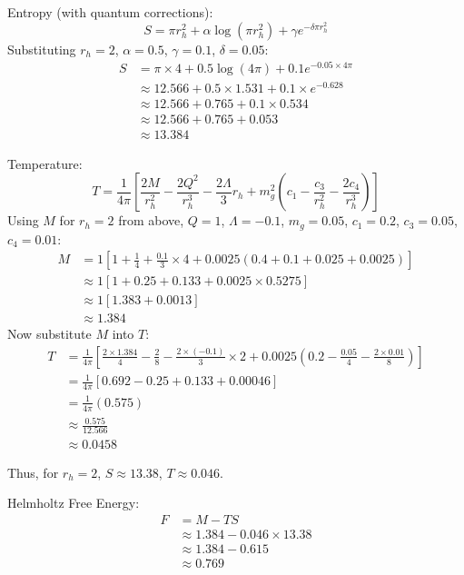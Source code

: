 \documentclass[12pt]{article}
\begin{document}
Entropy (with quantum corrections):
\begin{equation}
S = \pi r_h^2 + \alpha \log(\pi r_h^2) + \gamma e^{-\delta \pi r_h^2}
\end{equation}
Substituting $r_h = 2$, $\alpha = 0.5$, $\gamma = 0.1$, $\delta = 0.05$:
\begin{align*}
S &= \pi \times 4 + 0.5 \log(4\pi) + 0.1 e^{-0.05 \times 4\pi} \\
  &\approx 12.566 + 0.5 \times 1.531 + 0.1 \times e^{-0.628} \\
  &\approx 12.566 + 0.765 + 0.1 \times 0.534 \\
  &\approx 12.566 + 0.765 + 0.053 \\
  &\approx 13.384
\end{align*}

Temperature:
\begin{equation}
T = \frac{1}{4\pi} \left[ \frac{2M}{r_h^2} - \frac{2Q^2}{r_h^3} - \frac{2\Lambda}{3} r_h + m_g^2 \left(c_1 - \frac{c_3}{r_h^2} - \frac{2c_4}{r_h^3}\right) \right]
\end{equation}
Using $M$ for $r_h = 2$ from above, $Q = 1$, $\Lambda = -0.1$, $m_g = 0.05$, $c_1 = 0.2$, $c_3 = 0.05$, $c_4 = 0.01$:
\begin{align*}
M &= 1 \left[1 + \frac{1}{4} + \frac{0.1}{3} \times 4 + 0.0025 (0.4 + 0.1 + 0.025 + 0.0025)\right] \\
  &\approx 1 [1 + 0.25 + 0.133 + 0.0025 \times 0.5275] \\
  &\approx 1 [1.383 + 0.0013] \\
  &\approx 1.384
\end{align*}
Now substitute $M$ into $T$:
\begin{align*}
T &= \frac{1}{4\pi} \left[ \frac{2 \times 1.384}{4} - \frac{2}{8} - \frac{2 \times (-0.1)}{3} \times 2 + 0.0025 (0.2 - \frac{0.05}{4} - \frac{2 \times 0.01}{8}) \right] \\
  &= \frac{1}{4\pi} [0.692 - 0.25 + 0.133 + 0.00046] \\
  &= \frac{1}{4\pi} (0.575) \\
  &\approx \frac{0.575}{12.566} \\
  &\approx 0.0458
\end{align*}

Thus, for $r_h = 2$, $S \approx 13.38$, $T \approx 0.046$.

Helmholtz Free Energy:
\begin{align*}
F &= M - T S \\
  &\approx 1.384 - 0.046 \times 13.38 \\
  &\approx 1.384 - 0.615 \\
  &\approx 0.769
\end{align*}
\end{document}
